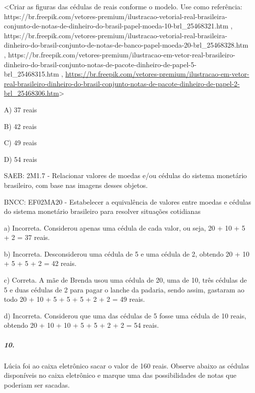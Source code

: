 \textless{}Criar as figuras das cédulas de reais conforme o modelo. Use
como referência:
https://br.freepik.com/vetores-premium/ilustracao-vetorial-real-brasileira-conjunto-de-notas-de-dinheiro-do-brasil-papel-moeda-10-brl\_25468321.htm
,
https://br.freepik.com/vetores-premium/ilustracao-vetorial-real-brasileira-dinheiro-do-brasil-conjunto-de-notas-de-banco-papel-moeda-20-brl\_25468328.htm
,
https://br.freepik.com/vetores-premium/ilustracao-em-vetor-real-brasileiro-dinheiro-do-brasil-conjunto-notas-de-pacote-dinheiro-de-papel-5-brl\_25468315.htm
,
\url{https://br.freepik.com/vetores-premium/ilustracao-em-vetor-real-brasileiro-dinheiro-do-brasil-conjunto-notas-de-pacote-dinheiro-de-papel-2-brl_25468306.htm}\textgreater{}

A) 37 reais

B) 42 reais

C) 49 reais

D) 54 reais

SAEB: 2M1.7 - Relacionar valores de moedas e/ou cédulas do sistema
monetário brasileiro, com base nas imagens desses objetos.

BNCC: EF02MA20 - Estabelecer a equivalência de valores entre moedas e
cédulas do sistema monetário brasileiro para resolver situações
cotidianas

a) Incorreta. Considerou apenas uma cédula de cada valor, ou seja, 20 +
10 + 5 + 2 = 37 reais.

b) Incorreta. Desconsiderou uma cédula de 5 e uma cédula de 2, obtendo
20 + 10 + 5 + 5 + 2 = 42 reais.

c) Correta. A mãe de Brenda usou uma cédula de 20, uma de 10, três
cédulas de 5 e duas cédulas de 2 para pagar o lanche da padaria, sendo
assim, gastaram ao todo 20 + 10 + 5 + 5 + 5 + 2 + 2 = 49 reais.

d) Incorreta. Considerou que uma das cédulas de 5 fosse uma cédula de 10
reais, obtendo 20 + 10 + 10 + 5 + 5 + 2 + 2 = 54 reais.

\subparagraph{10. }\label{section-139}

Lúcia foi ao caixa eletrônico sacar o valor de 160 reais. Observe abaixo
as cédulas disponíveis no caixa eletrônico e marque uma das
possibilidades de notas que poderiam ser sacadas.

